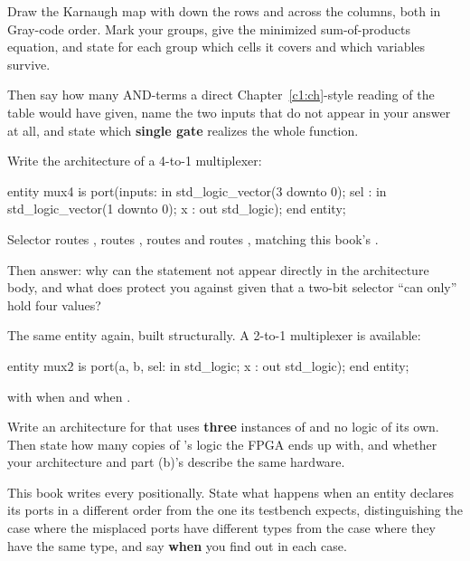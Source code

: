 \noindent Draw the Karnaugh map with  down the rows and  across the columns, both
in Gray-code order. Mark your groups, give the minimized sum-of-products equation, and state for
each group which cells it covers and which variables survive.

Then say how many AND-terms a direct Chapter~\ref{c1:ch}-style reading of the table would have
given, name the two inputs that do not appear in your answer at all, and state which \textbf{single
gate} realizes the whole function. 

 Write the architecture of a 4-to-1 multiplexer:

\begin{vhdlcode}
entity mux4 is
    port(inputs: in  std_logic_vector(3 downto 0);
         sel   : in  std_logic_vector(1 downto 0);
         x     : out std_logic);
end entity;
\end{vhdlcode}

\noindent Selector  routes ,  routes ,
 routes  and  routes , matching this book's
.

Then answer: why can the  statement not appear directly in the architecture body, and
what does  protect you against given that a two-bit selector ``can only'' hold
four values? 

 The same entity again, built structurally. A 2-to-1 multiplexer is available:

\begin{vhdlcode}
entity mux2 is
    port(a, b, sel: in  std_logic;
         x        : out std_logic);
end entity;
\end{vhdlcode}

\noindent with  when  and  when .

Write an architecture  for  that uses \textbf{three} instances of
 and no logic of its own. Then state how many copies of 's logic the FPGA ends
up with, and whether your architecture and part (b)'s describe the same hardware. 

 This book writes every  positionally. State what happens when an entity
declares its ports in a different order from the one its testbench expects, distinguishing the case
where the misplaced ports have different types from the case where they have the same type, and say
\textbf{when} you find out in each case. 

